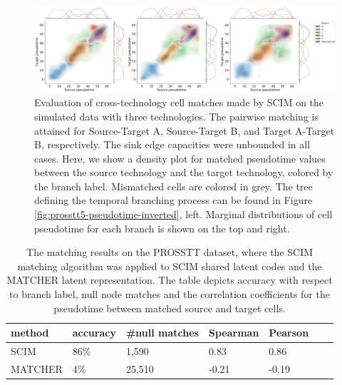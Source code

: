 \begin{figure}[htb]
    \centering
    \includegraphics[width=1\textwidth]{figures/integration/3tech-pseudotime-kde.png}
    \caption{
    Evaluation of cross-technology cell matches made by SCIM on the simulated data with three technologies. 
    The pairwise matching is attained for Source-Target A, Source-Target B, and Target A-Target B, respectively. The sink edge capacities were unbounded in all cases.
    Here, we show a density plot for matched pseudotime values between the source technology and the target technology,
    colored by the branch label. Mismatched cells are colored in grey.
    The tree defining the temporal branching process can be found in Figure \ref{fig:prosstt5-pseudotime-inverted}, left.
    Marginal distributions of cell pseudotime for each branch is shown on the top and right.
    }
    \label{fig:prosstt5-3tech-pseudotime}
\end{figure}

\begin{table}
\centering
\begin{tabular}{l|llllll}
\toprule
  method & accuracy & \#null matches & Spearman & Pearson \\
\midrule
 SCIM    &   86\% &  1,590  & 0.83  & 0.86\\
 MATCHER &   4\%  & 25,510  & -0.21 & -0.19\\
\bottomrule
\end{tabular}
\caption{The matching results on the PROSSTT dataset, where the SCIM matching algorithm was applied to SCIM shared latent codes and the MATCHER latent representation. The table depicts accuracy with respect to branch label, null node matches and the correlation coefficients for the pseudotime between matched source and target cells.}
\label{tbl:prosstt_matcher}
\end{table}

